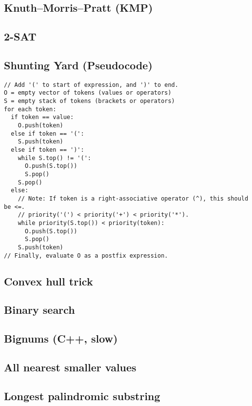 \documentclass[10pt]{extarticle}
\begin{document}
\begin{multicols*}{3}
\subsection{Knuth--Morris--Pratt (KMP)} %


\subsection{2-SAT} %


\subsection{Shunting Yard (Pseudocode)} %
\begin{lstlisting}
// Add '(' to start of expression, and ')' to end.
O = empty vector of tokens (values or operators)
S = empty stack of tokens (brackets or operators)
for each token:
  if token == value:
    O.push(token)
  else if token == '(':
    S.push(token)
  else if token == ')':
    while S.top() != '(':
      O.push(S.top())
      S.pop()
    S.pop()
  else:
    // Note: If token is a right-associative operator (^), this should be <=.
	// priority('(') < priority('+') < priority('*').
    while priority(S.top()) < priority(token):
      O.push(S.top())
      S.pop()
    S.push(token)
// Finally, evaluate O as a postfix expression.
\end{lstlisting}

\subsection{Convex hull trick} %


\subsection{Binary search} %


\subsection{Bignums (C++, slow)} %


\subsection{All nearest smaller values} %


\subsection{Longest palindromic substring} %

\end{multicols*}
\end{document}
